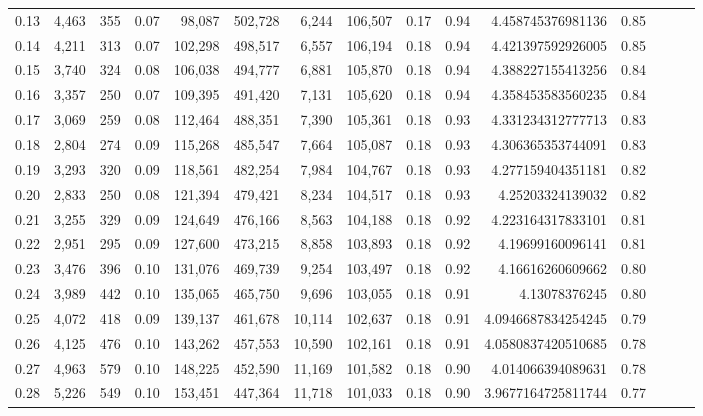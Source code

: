 \begin{tabular}{rrrrrrrrrrrrrrr}
0.13 &   4,463 &    355 &  0.07 &   98,087 &  502,728 &    6,244 &  106,507 &  0.17 &  0.94 &    4.458745376981136 &      0.85 \\
0.14 &   4,211 &    313 &  0.07 &  102,298 &  498,517 &    6,557 &  106,194 &  0.18 &  0.94 &    4.421397592926005 &      0.85 \\
0.15 &   3,740 &    324 &  0.08 &  106,038 &  494,777 &    6,881 &  105,870 &  0.18 &  0.94 &    4.388227155413256 &      0.84 \\
0.16 &   3,357 &    250 &  0.07 &  109,395 &  491,420 &    7,131 &  105,620 &  0.18 &  0.94 &    4.358453583560235 &      0.84 \\
0.17 &   3,069 &    259 &  0.08 &  112,464 &  488,351 &    7,390 &  105,361 &  0.18 &  0.93 &    4.331234312777713 &      0.83 \\
0.18 &   2,804 &    274 &  0.09 &  115,268 &  485,547 &    7,664 &  105,087 &  0.18 &  0.93 &    4.306365353744091 &      0.83 \\
0.19 &   3,293 &    320 &  0.09 &  118,561 &  482,254 &    7,984 &  104,767 &  0.18 &  0.93 &    4.277159404351181 &      0.82 \\
0.20 &   2,833 &    250 &  0.08 &  121,394 &  479,421 &    8,234 &  104,517 &  0.18 &  0.93 &     4.25203324139032 &      0.82 \\
0.21 &   3,255 &    329 &  0.09 &  124,649 &  476,166 &    8,563 &  104,188 &  0.18 &  0.92 &    4.223164317833101 &      0.81 \\
0.22 &   2,951 &    295 &  0.09 &  127,600 &  473,215 &    8,858 &  103,893 &  0.18 &  0.92 &     4.19699160096141 &      0.81 \\
0.23 &   3,476 &    396 &  0.10 &  131,076 &  469,739 &    9,254 &  103,497 &  0.18 &  0.92 &     4.16616260609662 &      0.80 \\
0.24 &   3,989 &    442 &  0.10 &  135,065 &  465,750 &    9,696 &  103,055 &  0.18 &  0.91 &        4.13078376245 &      0.80 \\
0.25 &   4,072 &    418 &  0.09 &  139,137 &  461,678 &   10,114 &  102,637 &  0.18 &  0.91 &   4.0946687834254245 &      0.79 \\
0.26 &   4,125 &    476 &  0.10 &  143,262 &  457,553 &   10,590 &  102,161 &  0.18 &  0.91 &   4.0580837420510685 &      0.78 \\
0.27 &   4,963 &    579 &  0.10 &  148,225 &  452,590 &   11,169 &  101,582 &  0.18 &  0.90 &    4.014066394089631 &      0.78 \\
0.28 &   5,226 &    549 &  0.10 &  153,451 &  447,364 &   11,718 &  101,033 &  0.18 &  0.90 &   3.9677164725811744 &      0.77 \\

\end{tabular}
